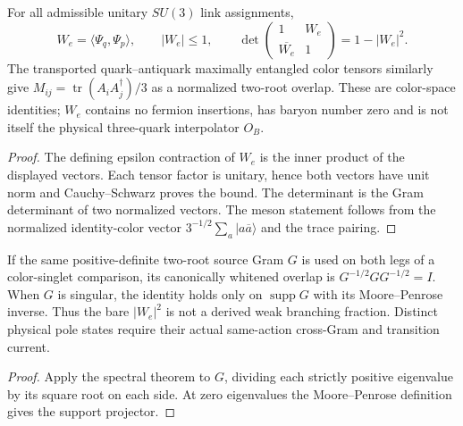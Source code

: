 \documentclass[12pt,a4paper]{article}
\begin{document}
\begin{proposition}
\label{p10:prop:v365-baryon-color-gram}
For all admissible unitary $SU(3)$ link assignments,
\[
\boxed{W_e=\langle\Psi_q,\Psi_p\rangle,\qquad
|W_e|\le1,\qquad
\det\begin{pmatrix}1&W_e\\\overline{W_e}&1\end{pmatrix}
=1-|W_e|^2.}
\]
The transported quark--antiquark maximally entangled color tensors
similarly give $M_{ij}=\operatorname{tr}(A_iA_j^\dagger)/3$
as a normalized two-root overlap.  These are color-space identities;
$W_e$ contains no fermion insertions, has baryon number zero and is
not itself the physical three-quark interpolator $O_B$.
\end{proposition}
\begin{proof}
The defining epsilon contraction of $W_e$ is the inner product
of the displayed vectors.  Each tensor factor is unitary, hence
both vectors have unit norm and Cauchy--Schwarz proves the bound.
The determinant is the Gram determinant of two normalized vectors.
The meson statement follows from the normalized identity-color
vector $3^{-1/2}\sum_a|a\overline a\rangle$ and the trace pairing.
\end{proof}

\begin{proposition}
\label{p10:prop:v365-color-whitening}
If the same positive-definite two-root source Gram $G$ is used on
both legs of a color-singlet comparison, its canonically whitened
overlap is $G^{-1/2}GG^{-1/2}=I$.  When $G$ is singular, the
identity holds only on $\operatorname{supp}G$ with its Moore--Penrose
inverse.  Thus the bare $|W_e|^2$ is not a derived weak branching
fraction.  Distinct physical pole states require their actual
same-action cross-Gram and transition current.
\end{proposition}
\begin{proof}
Apply the spectral theorem to $G$, dividing each strictly positive
eigenvalue by its square root on each side.  At zero eigenvalues
the Moore--Penrose definition gives the support projector.
\end{proof}
\end{document}
